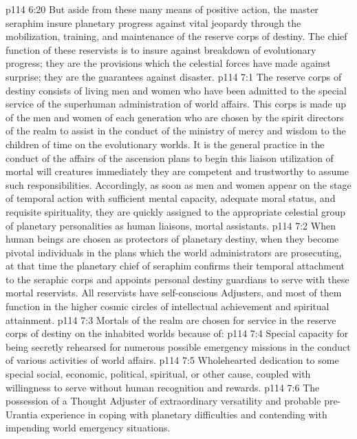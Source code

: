 \vs p114 6:20 But aside from these many means of positive action, the master seraphim insure planetary progress against vital jeopardy through the mobilization, training, and maintenance of the reserve corps of destiny. The chief function of these reservists is to insure against breakdown of evolutionary progress; they are the provisions which the celestial forces have made against surprise; they are the guarantees against disaster.
\vs p114 7:1 The reserve corps of destiny consists of living men and women who have been admitted to the special service of the superhuman administration of world affairs. This corps is made up of the men and women of each generation who are chosen by the spirit directors of the realm to assist in the conduct of the ministry of mercy and wisdom to the children of time on the evolutionary worlds. It is the general practice in the conduct of the affairs of the ascension plans to begin this liaison utilization of mortal will creatures immediately they are competent and trustworthy to assume such responsibilities. Accordingly, as soon as men and women appear on the stage of temporal action with sufficient mental capacity, adequate moral status, and requisite spirituality, they are quickly assigned to the appropriate celestial group of planetary personalities as human liaisons, mortal assistants.
\vs p114 7:2 When human beings are chosen as protectors of planetary destiny, when they become pivotal individuals in the plans which the world administrators are prosecuting, at that time the planetary chief of seraphim confirms their temporal attachment to the seraphic corps and appoints personal destiny guardians to serve with these mortal reservists. All reservists have self\hyp{}conscious Adjusters, and most of them function in the higher cosmic circles of intellectual achievement and spiritual attainment.
\vs p114 7:3 Mortals of the realm are chosen for service in the reserve corps of destiny on the inhabited worlds because of:
\vs p114 7:4 \bibnobreakspace Special capacity for being secretly rehearsed for numerous possible emergency missions in the conduct of various activities of world affairs.
\vs p114 7:5 \bibnobreakspace Wholehearted dedication to some special social, economic, political, spiritual, or other cause, coupled with willingness to serve without human recognition and rewards.
\vs p114 7:6 \bibnobreakspace The possession of a Thought Adjuster of extraordinary versatility and probable pre\hyp{}Urantia experience in coping with planetary difficulties and contending with impending world emergency situations.
